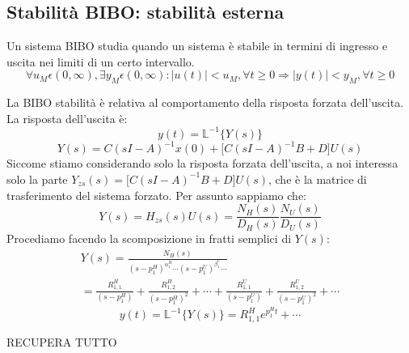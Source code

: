 \subsection{Stabilità BIBO: stabilità esterna}
Un sistema BIBO studia quando un sistema è stabile in termini di ingresso e
uscita nei limiti di un certo intervallo.
\begin{equation}
    \forall u_M \epsilon (0, \infty), \exists y_M \epsilon (0, \infty) : |u(t)| < u_M, \forall t \geq 0 \Rightarrow |y(t)| < y_M, \forall t \geq 0
\end{equation}
\begin{tcolorbox}
    La BIBO stabilità è relativa al comportamento della risposta forzata
    dell'uscita. La risposta dell'uscita è:
    \begin{equation}
        y(t) = \mathbb{L}^{-1} \{Y(s)\}
    \end{equation}
    \begin{equation}
        Y(s) = C (sI - A)^{-1} x(0) + {[}C (sI - A)^{-1} B + D{]} U(s)
    \end{equation}
    Siccome stiamo considerando solo la risposta forzata dell'uscita, a noi
    interessa solo la parte $Y_{zs}(s) = {[}C (sI - A)^{-1} B + D{]} U(s)$, che
    è la matrice di trasferimento del sistema forzato. Per assunto sappiamo che:
    \begin{equation}
        Y(s) = H_{zs}(s) U(s) = \frac{N_H(s)}{D_H(s)} \frac{N_U(s)}{D_U(s)}
    \end{equation}
    Procediamo facendo la scomposizione in fratti semplici di $Y(s)$:
    \begin{multline}
        Y(s) = \frac{N_H(s)}{(s-p_1^{H})^{\alpha_1^H} \cdots (s-p_1^{U})^{\beta_1^U} \cdots} \\
        = \frac{R_{1,1}^H}{(s-p_1^{H})} + \frac{R_{1,2}^H}{(s-p_1^{H})^2} + \cdots + \frac{R_{1,1}^U}{(s-p_1^{U})} + \frac{R_{1,2}^U}{(s-p_1^{U})^2} + \cdots
    \end{multline}
    \begin{equation}
        y(t) = \mathbb{L}^{-1} \{Y(s)\} = R_{1,1}^H e^{p_1^{H}t} + \cdots
    \end{equation}
\end{tcolorbox}
\begin{tcolorbox}
    RECUPERA TUTTO
\end{tcolorbox}

